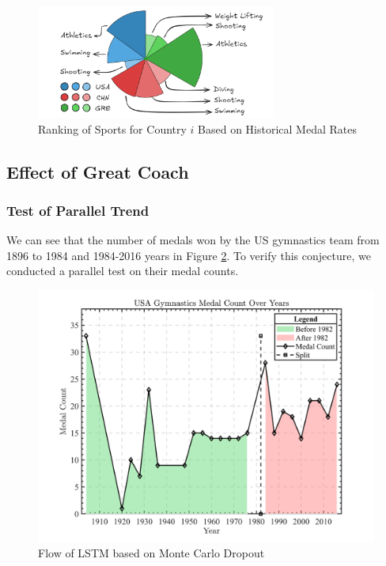 \documentclass{mcmthesis}
\begin{document}
\begin{itemize}[leftmargin=0.15in, labelsep=0.1in, itemsep=1pt, parsep=0pt]
	\begin{figure}[htbp]
		\centering
		\includegraphics[width=0.7\textwidth]{fig/Rose-Chart.png}
		\caption{Ranking of Sports for Country \( i \) Based on Historical Medal Rates}
		\label{fig:ranking}
	\end{figure}
\end{itemize}

\subsection{Effect of Great Coach}



\subsubsection{Test of Parallel Trend }

We can see that the number of medals won by the US gymnastics team from 1896 to 1984 and 1984-2016 years in Figure \ref{fig:USA-GYM}. To verify this conjecture, we conducted a parallel test on their medal counts.
\begin{figure}[H]
	\centering
	\includegraphics[width=0.7\linewidth]{fig/USA-GYM.png}
	\caption{Flow of LSTM based on Monte Carlo Dropout}
	\label{fig:USA-GYM}
\end{figure}
\end{document}

